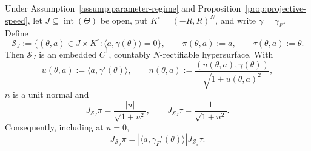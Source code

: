 \begin{lemma}
\label{lem:incidence-jacobians}
Under Assumption~\ref{assump:parameter-regime} and
Proposition~\ref{prop:projective-speed}, let
$J\subseteq\operatorname{int}(\Theta)$ be open, put
$K^\circ=(-R,R)^N$, and write $\gamma=\gamma_F$.  Define
\[
\mathcal S_J
:=\{(\theta,a)\in J\times K^\circ:
       \langle a,\gamma(\theta)\rangle=0\},
\qquad
\pi(\theta,a):=a,
\qquad
\tau(\theta,a):=\theta.
\]
Then $\mathcal S_J$ is an embedded $C^1$, countably $N$-rectifiable
hypersurface.  With
\[
u(\theta,a):=\langle a,\gamma'(\theta)\rangle,
\qquad
n(\theta,a):=\frac{(u(\theta,a),\gamma(\theta))}{\sqrt{1+u(\theta,a)^2}},
\]
$n$ is a unit normal and
\[
J_{\mathcal S_J}\pi
=\frac{|u|}{\sqrt{1+u^2}},
\qquad
J_{\mathcal S_J}\tau
=\frac1{\sqrt{1+u^2}}.
\]
Consequently, including at $u=0$,
\begin{equation}
J_{\mathcal S_J}\pi
=|\langle a,\gamma_F'(\theta)\rangle|
 J_{\mathcal S_J}\tau.
\label{eq:appendix-1}
\end{equation}
\end{lemma}

